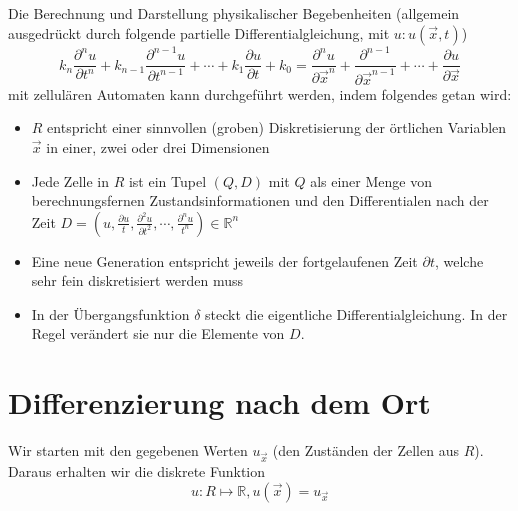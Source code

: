\documentclass[11pt]{article} %
\theoremstyle{definition}
\begin{document}
Die Berechnung und Darstellung physikalischer Begebenheiten (allgemein ausgedrückt durch folgende partielle Differentialgleichung, mit $u: u(\vec{x}, t)$)
\begin{equation*}
k_n \frac{\partial^n u}{\partial t^n} + k_{n-1} \frac{\partial^{n-1} u}{\partial t^{n-1}} + \cdots + k_1 \frac{\partial u}{\partial t} + k_0 = \frac{\partial^n u}{\partial  \vec{x}^n} + \frac{\partial^{n-1}}{\partial \vec{x}^{n-1}} + \cdots + \frac{\partial u}{\partial \vec{x}}
\end{equation*}
mit zellulären Automaten kann durchgeführt werden, indem folgendes getan wird:
\begin{itemize}
\item $R$ entspricht einer sinnvollen (groben) Diskretisierung der örtlichen Variablen $\vec{x}$ in einer, zwei oder drei Dimensionen
\item Jede Zelle in $R$ ist ein Tupel $(Q, D)$ mit $Q$ als einer Menge von berechnungsfernen Zustandsinformationen und den Differentialen nach der Zeit $D = \left( u, \frac{\partial u}{t}, \frac{\partial^2 u}{\partial t^2}, \cdots, \frac{\partial^n u}{t^n} \right)  \in \mathbb{R}^n$
\item Eine neue Generation entspricht jeweils der fortgelaufenen Zeit $\partial t$, welche sehr fein diskretisiert werden muss
\item In der Übergangsfunktion $\delta$ steckt die eigentliche Differentialgleichung. In der Regel verändert sie nur die Elemente von $D$.
\end{itemize}

\section{Differenzierung nach dem Ort}


Wir starten mit den gegebenen Werten $u_{\vec x}$ (den Zuständen der Zellen aus $R$). Daraus erhalten wir die diskrete Funktion
\[
u: R \mapsto \mathbb{R}, u(\vec x) = u_{\vec x}
\]
\end{document}
